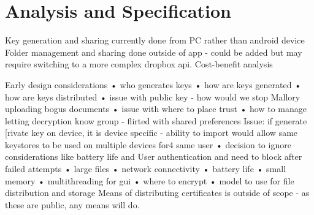 
\chapter{Analysis and Specification}
\label{cha:analysis}

Key generation and sharing currently done from PC rather than android device 
Folder management and sharing done outside of app - could be added but may require switching to a more complex dropbox api.  Cost-benefit analysis

Early design considerations 
• who generates keys
• how are keys generated
• how are keys distributed
• issue with public key - how would we stop Mallory uploading bogus documents
• issue with where to place trust
• how to manage letting decryption know group - flirted with shared preferences
Issue: if generate [rivate key on device, it is device specific - ability to import would allow same keystores to be used on multiple devices for4 same user
• decision to ignore considerations like battery life and 
User authentication and need to block after failed attempts
• large files
• network connectivity
• battery life
• small memory
• multithreading for gui
• where to encrypt
• model to use for file distribution and storage
Means of distributing certificates is outside of scope - as these are public, any means will do.
